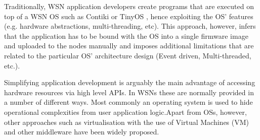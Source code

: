 Traditionally, WSN application developers create programs that are executed on top of a WSN OS such as Contiki \cite{1367266} or TinyOS \cite{1630599}, hence exploiting the OS' features (e.g. hardware abstractions, multi-threading, etc). This approach, however, infers that the application has to be bound with the OS into a single firmware image and uploaded to the nodes manually and imposes additional limitations that are related to the particular OS' architecture design (Event driven, Multi-threaded, etc.).

Simplifying application development is arguably the main advantage of accessing hardware resources via high level APIs. In WSNs these are normally provided in a number of different ways. Most commonly an operating system is used to hide operational complexities from user application logic.Apart from OSs, however, other approaches such as virtualisation with the use of Virtual Machines (VM) \cite{Levis:2002:MTV:635506.605407,simon2005squawk,hong2009tinyvm,4300022} and other middleware \cite{Fok:2009:AMA:1552297.1552299,1621014,6529470,6671886} have been widely proposed.

